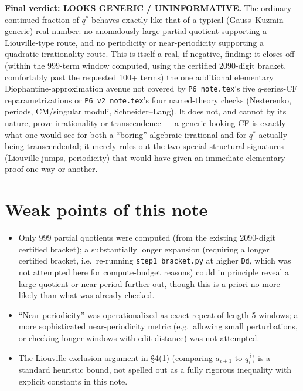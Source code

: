 \documentclass[11pt]{article}
\begin{document}
\textbf{Final verdict: LOOKS GENERIC / UNINFORMATIVE.} The ordinary continued fraction of $q^\ast$
behaves exactly like that of a typical (Gauss--Kuzmin-generic) real number: no anomalously large
partial quotient supporting a Liouville-type route, and no periodicity or near-periodicity
supporting a quadratic-irrationality route. This is itself a real, if negative, finding: it closes
off (within the 999-term window computed, using the certified 2090-digit bracket, comfortably
past the requested 100+ terms) the one additional elementary Diophantine-approximation avenue not
covered by \texttt{P6\_note.tex}'s five $q$-series-CF reparametrizations or \texttt{P6\_v2\_note.tex}'s
four named-theory checks (Nesterenko, periods, CM/singular moduli, Schneider--Lang). It does not,
and cannot by its nature, prove irrationality or transcendence --- a generic-looking CF is exactly
what one would see for both a ``boring'' algebraic irrational and for $q^\ast$ actually being
transcendental; it merely rules out the two special structural signatures (Liouville jumps,
periodicity) that would have given an immediate elementary proof one way or another.

\section{Weak points of this note}
\begin{itemize}
\item Only 999 partial quotients were computed (from the existing 2090-digit certified bracket);
a substantially longer expansion (requiring a longer certified bracket, i.e.\ re-running
\texttt{step1\_bracket.py} at higher \texttt{Dd}, which was not attempted here for compute-budget
reasons) could in principle reveal a large quotient or near-period further out, though this is a
priori no more likely than what was already checked.
\item ``Near-periodicity'' was operationalized as exact-repeat of length-5 windows; a more
sophisticated near-periodicity metric (e.g.\ allowing small perturbations, or checking longer
windows with edit-distance) was not attempted.
\item The Liouville-exclusion argument in \S4(1) (comparing $a_{i+1}$ to $q_i^{\,i}$) is a standard
heuristic bound, not spelled out as a fully rigorous inequality with explicit constants in this
note.
\end{itemize}
\end{document}

